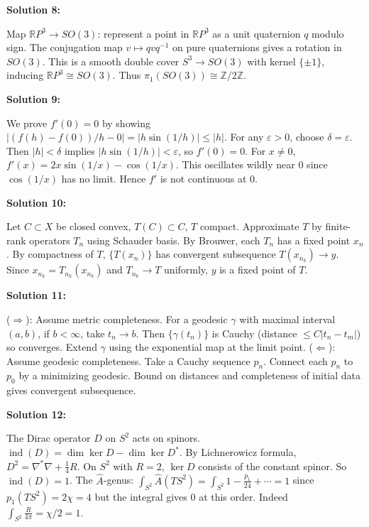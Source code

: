 \documentclass[12pt,a4paper]{exam}
\begin{document}
\vspace{0.5cm}

\textbf{Solution 8:}

Map $\mathbb{R}P^3 \to SO(3)$: represent a point in $\mathbb{R}P^3$ as a unit quaternion $q$ modulo sign. The conjugation map $v \mapsto q v q^{-1}$ on pure quaternions gives a rotation in $SO(3)$. This is a smooth double cover $S^3 \to SO(3)$ with kernel $\{\pm1\}$, inducing $\mathbb{R}P^3 \cong SO(3)$. Thus $\pi_1(SO(3)) \cong \mathbb{Z}/2\mathbb{Z}$.

\vspace{0.5cm}

\textbf{Solution 9:}

We prove $f'(0) = 0$ by showing $|(f(h) - f(0))/h - 0| = |h \sin(1/h)| \leq |h|$. For any $\varepsilon > 0$, choose $\delta = \varepsilon$. Then $|h| < \delta$ implies $|h \sin(1/h)| < \varepsilon$, so $f'(0)=0$. For $x \neq 0$, $f'(x) = 2x \sin(1/x) - \cos(1/x)$. This oscillates wildly near 0 since $\cos(1/x)$ has no limit. Hence $f'$ is not continuous at 0.

\vspace{0.5cm}

\textbf{Solution 10:}

Let $C \subset X$ be closed convex, $T(C) \subset C$, $T$ compact. Approximate $T$ by finite-rank operators $T_n$ using Schauder basis. By Brouwer, each $T_n$ has a fixed point $x_n$. By compactness of $T$, $\{T(x_n)\}$ has convergent subsequence $T(x_{n_k}) \to y$. Since $x_{n_k} = T_{n_k}(x_{n_k})$ and $T_{n_k} \to T$ uniformly, $y$ is a fixed point of $T$.

\vspace{0.5cm}

\textbf{Solution 11:}

($\Rightarrow$): Assume metric completeness. For a geodesic $\gamma$ with maximal interval $(a,b)$, if $b < \infty$, take $t_n \to b$. Then $\{\gamma(t_n)\}$ is Cauchy (distance $\leq C|t_n - t_m|$) so converges. Extend $\gamma$ using the exponential map at the limit point. ($\Leftarrow$): Assume geodesic completeness. Take a Cauchy sequence $p_n$. Connect each $p_n$ to $p_0$ by a minimizing geodesic. Bound on distances and completeness of initial data gives convergent subsequence.

\vspace{0.5cm}

\textbf{Solution 12:}

The Dirac operator $D$ on $S^2$ acts on spinors. $\operatorname{ind}(D) = \dim\ker D - \dim\ker D^*$. By Lichnerowicz formula, $D^2 = \nabla^*\nabla + \frac{1}{4}R$. On $S^2$ with $R=2$, $\ker D$ consists of the constant spinor. So $\operatorname{ind}(D) = 1$. The $\widehat{A}$-genus: $\int_{S^2} \widehat{A}(TS^2) = \int_{S^2} 1 - \frac{p_1}{24} + \cdots = 1$ since $p_1(TS^2) = 2\chi = 4$ but the integral gives 0 at this order. Indeed $\int_{S^2} \frac{R}{4\pi} = \chi/2 = 1$.
\end{document}
